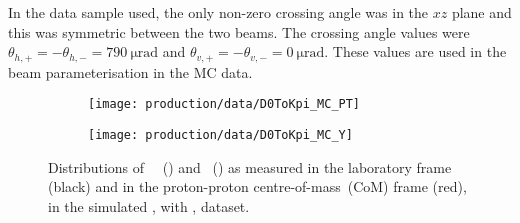 In the data sample used, the only non-zero crossing angle was in the $xz$ plane 
and this was symmetric between the two beams.
The crossing angle values were $\theta_{h,+} = -\theta_{h,-} = 
\SI{790}{\micro\radian}$ and $\theta_{v,+} = -\theta_{v,-} = 
\SI{0}{\micro\radian}$.
These values are used in the beam parameterisation in the \ac{MC} data.

\begin{figure}
  \begin{subfigure}[b]{0.5\textwidth}
    \centering
    \texttt{[image: production/data/D0ToKpi\_MC\_PT]}
    \caption{\pT}
    \label{fig:prod:data:com_boost:pt}
  \end{subfigure}
  \begin{subfigure}[b]{0.5\textwidth}
    \centering
    \texttt{[image: production/data/D0ToKpi\_MC\_Y]}
    \caption{\rapidity}
    \label{fig:prod:data:com_boost:y}
  \end{subfigure}
  \caption{%
    Distributions of \PDzero\ \pT~() and 
    \rapidity~() as measured in the 
    laboratory frame (black) and in the proton-proton centre-of-mass~(CoM) 
    frame (red), in the simulated \DstToDzpi, with \DzToKpi, dataset.
  }
  \label{fig:prod:data:com_boost}
\end{figure}
